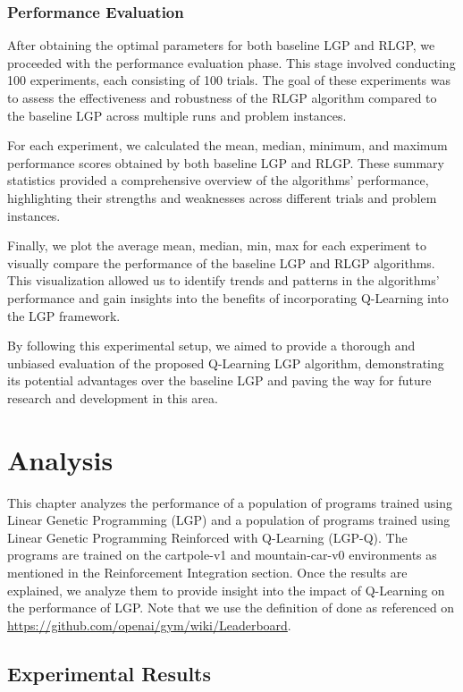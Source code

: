 \documentclass[12pt]{report}
\begin{document}
\subsection{Performance Evaluation}

After obtaining the optimal parameters for both baseline LGP and RLGP, we proceeded with the performance evaluation phase. This stage involved conducting 100 experiments, each consisting of 100 trials. The goal of these experiments was to assess the effectiveness and robustness of the RLGP algorithm compared to the baseline LGP across multiple runs and problem instances.

For each experiment, we calculated the mean, median, minimum, and maximum performance scores obtained by both baseline LGP and RLGP. These summary statistics provided a comprehensive overview of the algorithms' performance, highlighting their strengths and weaknesses across different trials and problem instances.

Finally, we plot the average mean, median, min, max for each experiment to visually compare the performance of the baseline LGP and RLGP algorithms. This visualization allowed us to identify trends and patterns in the algorithms' performance and gain insights into the benefits of incorporating Q-Learning into the LGP framework.

By following this experimental setup, we aimed to provide a thorough and unbiased evaluation of the proposed Q-Learning LGP algorithm, demonstrating its potential advantages over the baseline LGP and paving the way for future research and development in this area.

\chapter{Analysis}

This chapter analyzes the performance of a population of programs trained using Linear Genetic Programming (LGP)
and a population of programs trained using Linear Genetic Programming Reinforced with Q-Learning (LGP-Q). The programs
are trained on the cartpole-v1 and mountain-car-v0 environments \cite{1606.01540} as mentioned in the Reinforcement Integration section.
Once the results are explained, we analyze them to provide insight into the impact of Q-Learning on the performance of LGP. Note that we use the definition of done as referenced on \url{https://github.com/openai/gym/wiki/Leaderboard}.

\section{Experimental Results}
\end{document}
